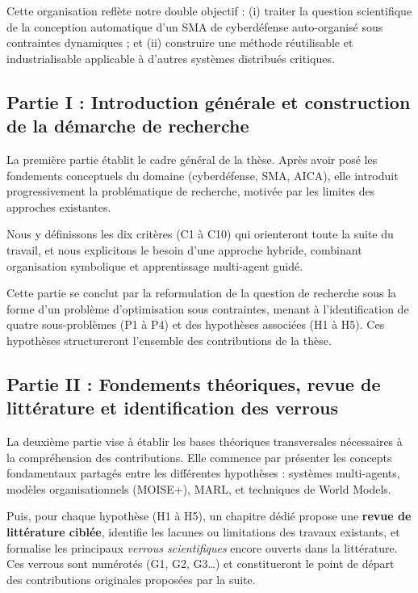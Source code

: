 \documentclass[ twoside,openright,titlepage,numbers=noenddot,headinclude,%
                footinclude=true,cleardoublepage=empty,abstractoff, %
                BCOR=5mm,paper=a4,fontsize=11pt,%
                french,american,%
                ]{scrreprt}
\begin{document}
Cette organisation reflète notre double objectif : (i) traiter la question scientifique de la conception automatique d'un SMA de cyberdéfense auto-organisé sous contraintes dynamiques ; et (ii) construire une méthode réutilisable et industrialisable applicable à d'autres systèmes distribués critiques.

\subsection*{Partie I : Introduction générale et construction de la démarche de recherche}

La première partie établit le cadre général de la thèse. Après avoir posé les fondements conceptuels du domaine (cyberdéfense, SMA, AICA), elle introduit progressivement la problématique de recherche, motivée par les limites des approches existantes. 

Nous y définissons les dix critères (C1 à C10) qui orienteront toute la suite du travail, et nous explicitons le besoin d'une approche hybride, combinant organisation symbolique et apprentissage multi-agent guidé.

Cette partie se conclut par la reformulation de la question de recherche sous la forme d'un problème d'optimisation sous contraintes, menant à l'identification de quatre sous-problèmes (P1 à P4) et des hypothèses associées (H1 à H5). Ces hypothèses structureront l'ensemble des contributions de la thèse.

\subsection*{Partie II : Fondements théoriques, revue de littérature et identification des verrous}

La deuxième partie vise à établir les bases théoriques transversales nécessaires à la compréhension des contributions. Elle commence par présenter les concepts fondamentaux partagés entre les différentes hypothèses : systèmes multi-agents, modèles organisationnels (MOISE+), MARL, et techniques de World Models.

Puis, pour chaque hypothèse (H1 à H5), un chapitre dédié propose une \textbf{revue de littérature ciblée}, identifie les lacunes ou limitations des travaux existants, et formalise les principaux \textit{verrous scientifiques} encore ouverts dans la littérature. Ces verrous sont numérotés (G1, G2, G3…) et constitueront le point de départ des contributions originales proposées par la suite.
\end{document}
